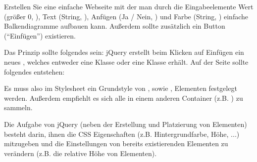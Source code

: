 %
\par Erstellen Sie eine einfache Webseite mit der man durch die Eingabeelemente Wert (größer $0$, ), Text (String, ), Anfügen (Ja / Nein, ) und Farbe (String, ) einfache Balkendiagramme aufbauen kann. Außerdem sollte zusätzlich ein Button (``Einfügen'') existieren.
%

%
\par Das Prinzip sollte folgendes sein: jQuery erstellt beim Klicken auf Einfügen ein neues , welches entweder eine Klasse  oder eine Klasse  erhält. Auf der Seite sollte folgendes entstehen:

\par Es muss also im Stylesheet ein Grundstyle von , sowie , Elementen festgelegt werden. Außerdem empfiehlt es sich alle  in einem anderen Container (z.B. ) zu sammeln.
%
\par Die Aufgabe von jQuery (neben der Erstellung und Platzierung von Elementen) besteht darin, ihnen die CSS Eigenschaften (z.B. Hintergrundfarbe, Höhe, ...) mitzugeben und die Einstellungen von bereits existierenden Elementen zu verändern (z.B. die relative Höhe von  Elementen).